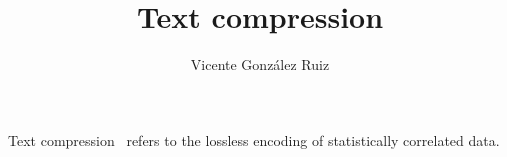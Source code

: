 \title{Text compression}
\author{Vicente González Ruiz}
\maketitle
\tableofcontents

Text compression~\cite{mahoney2012data, wikibooks2018data,
  moffat2002compression, wiegand2011source, blelloch2001introduction,
  salomon2004data} refers to the lossless encoding of statistically
correlated data.

\section{}
\section{}
\section{}


